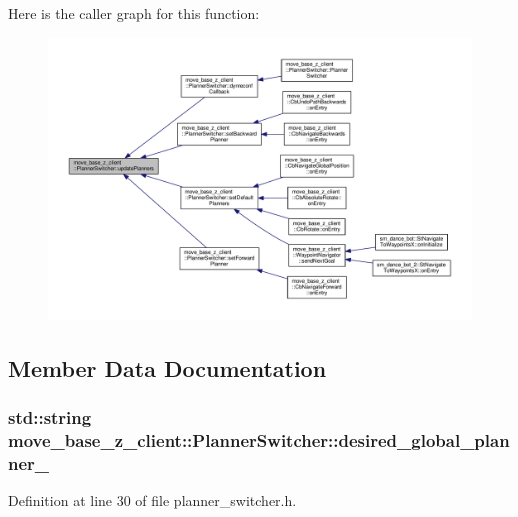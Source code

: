 Here is the caller graph for this function\+:\nopagebreak
\begin{figure}[H]
\begin{center}
\leavevmode
\includegraphics[width=350pt]{classmove__base__z__client_1_1PlannerSwitcher_a189ac8c027169a111c7d8e14d864752f_icgraph}
\end{center}
\end{figure}




\subsection{Member Data Documentation}
\subsubsection[{\texorpdfstring{desired\+\_\+global\+\_\+planner\+\_\+}{desired_global_planner_}}]{\setlength{\rightskip}{0pt plus 5cm}std\+::string move\+\_\+base\+\_\+z\+\_\+client\+::\+Planner\+Switcher\+::desired\+\_\+global\+\_\+planner\+\_\+\hspace{0.3cm}{\ttfamily [private]}}\hypertarget{classmove__base__z__client_1_1PlannerSwitcher_a004c15858f0a6b9abcd8211d58a7e34c}{}\label{classmove__base__z__client_1_1PlannerSwitcher_a004c15858f0a6b9abcd8211d58a7e34c}


Definition at line 30 of file planner\+\_\+switcher.\+h.



